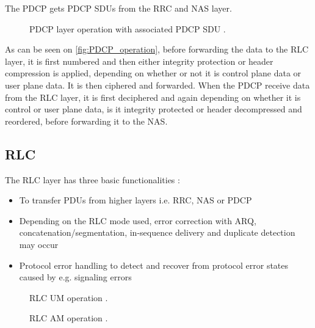 The \gls{PDCP} gets \gls{PDCP} \gls{SDU}s from the \gls{RRC} and \gls{NAS} layer. 

\begin{figure}[H]
\centering
\resizebox{0.8\textwidth}{!}{
}
\caption{\gls{PDCP} layer operation with associated \gls{PDCP} \gls{SDU} \citep[fig. 6.12]{book_LTE_for_UMTS}.}
\label{fig:PDCP_operation}
\end{figure}

As can be seen on \autoref{fig:PDCP_operation}, before forwarding the data to the \gls{RLC} layer, it is first numbered and then either integrity protection or header compression is applied, depending on whether or not it is control plane data or user plane data. It is then ciphered and forwarded. When the \gls{PDCP} receive data from the \gls{RLC} layer, it is first deciphered and again depending on whether it is control or user plane data, is it integrity protected or header decompressed and reordered, before forwarding it to the \gls{NAS}. \citep[ch. 6.5]{book_LTE_for_UMTS}  


\subsection{RLC}

The \gls{RLC} layer has three basic functionalities \cite[ch. 6.4]{book_LTE_for_UMTS}:

\begin{itemize}
	\item To transfer \gls{PDU}s from higher layers i.e. \gls{RRC}, \gls{NAS} or \gls{PDCP}
	\item Depending on the \gls{RLC} mode used, error correction with \gls{ARQ}, concatenation/segmentation, in-sequence delivery and duplicate detection may occur
	\item Protocol error handling to detect and recover from protocol error states caused by e.g. signaling errors
\end{itemize}

\captionsetup{belowskip=0em}
\begin{minipage}[H]{0.48\textwidth}
\begin{figure}[H]
\centering
\resizebox{\textwidth}{!}{
}
\caption{\gls{RLC} \gls{UM} operation \citep[ch. 6.4]{book_LTE_for_UMTS}.}
\label{fig:RLC_AM/UM_operation2}
\end{figure}
\end{minipage}
\begin{minipage}[H]{0.48\textwidth}
\begin{figure}[H]
\centering
\resizebox{\textwidth}{!}{
}
\caption{\gls{RLC} \gls{AM} operation \citep[ch. 6.4]{book_LTE_for_UMTS}.}
\label{fig:RLC_AM/UM_operation}
\end{figure}
\end{minipage}
\captionsetup{belowskip=-1.5em}


